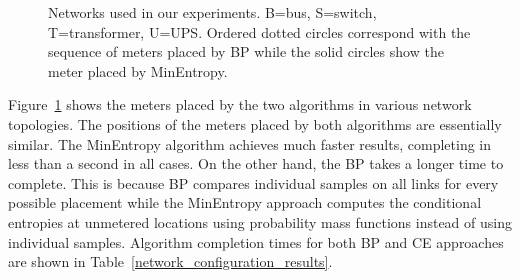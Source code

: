 \begin{figure}[!t]
\centering
{}

\begin{centering}
\end{centering}

\begin{centering}
\end{centering}

\begin{centering}
\end{centering}

\caption{Networks used in our experiments. B=bus, S=switch, T=transformer,
U=UPS. Ordered dotted circles correspond with the sequence of meters
placed by BP while the solid circles show the meter placed by MinEntropy.} 
\label{NetworkDiagrams}
\end{figure}

Figure~\ref{NetworkDiagrams} shows the meters placed by the two algorithms in various network topologies. The positions of the meters placed by both algorithms are essentially similar. The MinEntropy algorithm achieves much faster results, completing in less than a second in all cases. On the other hand, the BP takes a longer time to complete. This is because BP compares individual samples on all links for every possible placement while the MinEntropy approach computes the conditional entropies at unmetered locations using probability mass functions instead of using individual samples. Algorithm completion times for both BP and CE approaches are shown in Table~\ref{network_configuration_results}.

